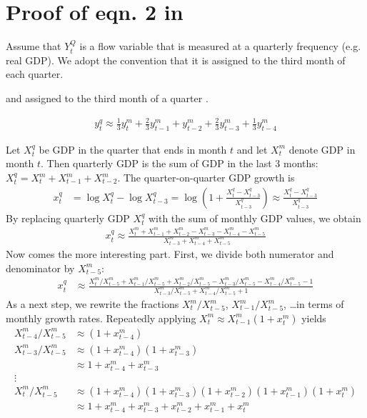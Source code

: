 \chapter{Proof of eqn. 2 in \citet{MarianoMurasawa2003}}\label{sec:mariano-murasawa}
	
Assume that $Y_t^Q$ is a flow variable that is measured at a quarterly frequency (e.g. real GDP). We adopt the convention that it is assigned to the third month of each quarter.

 and assigned to the third month of a quarter . 
	
\begin{align}
y_t^q \approx \frac{1}{3} y_t^m + \frac{2}{3} y_{t-1}^m + y_{t-2}^m + \frac{2}{3} y_{t-3}^m + \frac{1}{3} y_{t-4}^m
\end{align}

Let $X^q_t$ be GDP in the quarter that ends in month $t$ and let $X^m_t$ denote GDP in month $t$. Then quarterly GDP is the sum of GDP in the last 3 months: $X^q_t = X^m_t + X^m_{t-1} + X^m_{t-2}$. The quarter-on-quarter GDP growth is
\begin{align}
x^q_t &= \log X^q_t - \log X^q_{t-3} 
= \log(1 + \frac{X^q_t-X^q_{t-3}}{X^q_{t-3}}) 
\approx \frac{X^q_t-X^q_{t-3}}{X^q_{t-3}}
\end{align}
By replacing quarterly GDP $X^q_t$ with the sum of monthly GDP values, we obtain
\begin{align}
x^q_t \approx \frac{X^m_t + X^m_{t-1} + X^m_{t-2} - X^m_{t-3} - X^m_{t-4} - X^m_{t-5}}{X^m_{t-3} + X^m_{t-4} + X^m_{t-5}}
\end{align}
Now comes the more interesting part. First, we divide both numerator and denominator by $X^m_{t-5}$:
\begin{align}
x^q_t &\approx \frac{X^m_t/X^m_{t-5} + X^m_{t-1}/X^m_{t-5} + X^m_{t-2}/X^m_{t-5} - X^m_{t-3}/X^m_{t-5} - X^m_{t-4}/X^m_{t-5} - 1}{X^m_{t-3}/X^m_{t-5} + X^m_{t-4}/X^m_{t-5} + 1}
\end{align}
As a next step, we rewrite the fractions $X_t^m/X_{t-5}^m$, $X_{t-1}^m/X_{t-5}^m$, \dots in terms of monthly growth rates. Repeatedly applying $X_t^m \approx X_{t-1}^m(1+x_{t}^m)$ yields
\begin{align}
X_{t-4}^m/X_{t-5}^m &\approx (1+x_{t-4}^m) \\
X_{t-3}^m/X_{t-5}^m &\approx (1+x_{t-4}^m)(1+x_{t-3}^m) \\
&\approx 1 + x_{t-4}^m + x_{t-3}^m \\
\vdots &  \\
X_t^m/X_{t-5}^m &\approx (1+x_{t-4}^m)(1+x_{t-3}^m)(1+x_{t-2}^m)(1+x_{t-1}^m)(1+x_t^m) \\
&\approx 1 + x_{t-4}^m + x_{t-3}^m + x_{t-2}^m + x_{t-1}^m + x_t^m
\end{align}
